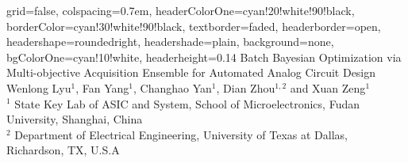 \documentclass[landscape,paperwidth=200cm, paperheight=120cm,fontscale=0.19]{baposter}
\begin{document}
\begin{poster}{
 grid=false,
 colspacing=0.7em,
 headerColorOne=cyan!20!white!90!black,
 borderColor=cyan!30!white!90!black,
 textborder=faded,
 headerborder=open,
 headershape=roundedright,
 headershade=plain,
 background=none,
 bgColorOne=cyan!10!white,
 headerheight=0.14\textheight}
 {
 }
 {Batch Bayesian Optimization via Multi-objective Acquisition Ensemble for Automated Analog Circuit Design}
    {
        Wenlong Lyu$^1$, Fan Yang$^1$, Changhao Yan$^1$, Dian Zhou$^{1, 2}$ and Xuan Zeng$^1$ \\
        $^1$ \small State Key Lab of ASIC and System, School of Microelectronics, Fudan University, Shanghai, China \\
        $^2$ \small Department of Electrical Engineering, University of Texas at Dallas, Richardson, TX, U.S.A
    }
 {
 }



\end{poster}
\end{document}
